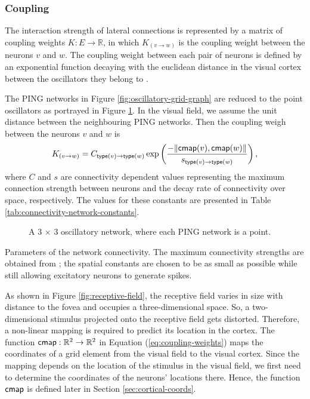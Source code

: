 \subsubsection{Coupling}

The interaction strength of lateral connections is represented by a matrix of coupling weights $K: E \to \mathbb{R}$, in which $K_{(v \to w)}$ is the coupling weight between the neurons $v$ and $w$. 
The coupling weight between each pair of neurons is defined by an exponential function decaying with the euclidean distance in the visual cortex between the oscillators they belong to \cite{Lowet2015}. 

The PING networks in Figure \ref{fig:oscillatory-grid-graph} are reduced to the point oscillators as portrayed in Figure \ref{fig:oscillatory-point-grid}. In the visual field, we assume the unit distance between the neighbouring PING networks. Then the coupling weigh between the neurons $v$ and $w$ is
\begin{equation}
    K_{(v \to w)} = C_{\mathsf{type}(v) \to \mathsf{type}(w)} \exp \left( \frac{-\| \mathsf{cmap}(v), \mathsf{cmap}(w) \|}{s_{\mathsf{type}(v) \to \mathsf{type}(w)}} \right),
    \label{eq:coupling-weights}
\end{equation}
where $C$ and $s$ are connectivity dependent values representing the maximum connection strength between neurons and the decay rate of connectivity over space, respectively. The values for these constants are presented in Table \ref{tab:connectivity-network-constants}.

\begin{figure}[!htp]
    \centering
    
    \caption[Point-PING oscillatory network]{A 3 $\times$ 3 oscillatory network, where each PING network is a point.}
    \label{fig:oscillatory-point-grid}
\end{figure}

\begin{table}[!htp] 
    \centering
    
    \caption[Network connectivity parameters]{Parameters of the network connectivity. The maximum connectivity strengths are obtained from \cite{Lowet2015}; the spatial constants are chosen to be as small as possible while still allowing excitatory neurons to generate spikes.}
    \label{tab:connectivity-network-constants}
\end{table}

As shown in Figure \ref{fig:receptive-field}, the receptive field varies in size with distance to the fovea and occupies a three-dimensional space. So, a two-dimensional stimulus projected onto the receptive field gets distorted. Therefore, a non-linear mapping is required to predict its location in the cortex.
The function $\mathsf{cmap}: \mathbb{R}^2 \to \mathbb{R}^2$ in Equation (\ref{eq:coupling-weights}) maps the coordinates of a grid element from the visual field to the visual cortex. Since the mapping depends on the location of the stimulus in the visual field, we first need to determine the coordinates of the neurons' locations there. Hence, the function $\mathsf{cmap}$ is defined later in Section \ref{sec:cortical-coords}.

\begin{comment}

Let $\loc: V \to \mathbb{Z}_+^2$ be a function mapping a neuron to the position of the oscillator it belongs to in the grid, assuming the unit distance between the neighbouring PING networks.

\end{comment}